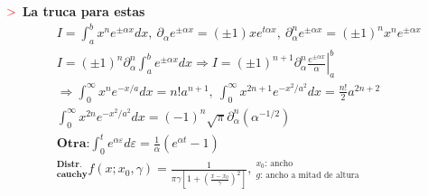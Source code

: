 \documentclass[%
 reprint,
 amsmath,amssymb,
 aps,
]{revtex4-1}
\begin{document}
\textbf{$\textcolor{red}{\mathbf{>}}$ La truca para estas }
$$
\begin{aligned}
%
&I = \int _ { a } ^ { b } x ^ { n } e ^ { \pm \alpha x } d x
, \ 
{ \partial _ { \alpha } e ^ { \pm \alpha x } = ( \pm 1 ) x e ^ { t \alpha x } } , \ { \partial _ { \alpha } ^ { n } e ^ { \pm \alpha x } = ( \pm 1 ) ^ { n } x ^ { n } e ^ { \pm \alpha x } } \\
% 
& I = ( \pm 1 ) ^ { n } \partial _ { \alpha } ^ { n } \int _ { a } ^ { b } e ^ { \pm \alpha x } d x \Rightarrow I = \left. ( \pm 1 ) ^ { n+1 } \partial _ { \alpha } ^ { n } { \frac{e ^ { \pm \alpha x }}{\alpha} } \right| ^{ b }_ { a } \\
% 
&\Rightarrow { \int _ { 0 } ^ { \infty } x ^ { n } e ^ { - x / a } d x = n ! a ^ { n + 1 } } , \ { \int _ { 0 } ^ { \infty } x ^ { 2 n + 1 } e ^ { - x ^ { 2 } / a ^ { 2 } } d x = \frac { n ! } { 2 } a ^ { 2 n + 2 } } \\
% 
& \int _ { 0 } ^ { \infty } x ^ { 2 n } e ^ { - x ^ { 2 } / a ^ { 2 } } d x =  (-1)^n \sqrt { \pi } \partial_\alpha^n (\alpha^{-1/2}) \\
% 
&
\textbf{Otra:}  \int_0 ^t e^{\alpha \varepsilon} d \varepsilon = \frac{1}{\alpha} (e^{\alpha t} - 1)\\
%
&
^\textbf{Distr.}
_\textbf{cauchy}
f\left(x ; x_{0}, \gamma\right)=\frac{1}{\pi \gamma\left[1+\left(\frac{x-x_{0}}{\gamma}\right)^{2}\right]}
,\
^\text{$x_0$: ancho}
_\text{$g$: ancho a mitad de altura}
\end{aligned}
$$
\end{document}
